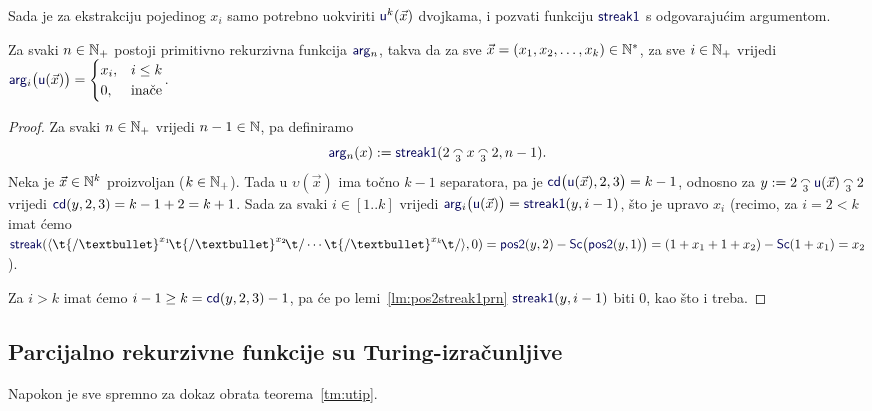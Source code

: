 Sada je za ekstrakciju pojedinog $x_i$ samo potrebno uokviriti $\f u^k(\vec x)$ dvojkama, i pozvati funkciju $\f{streak1}$ s odgovarajućim argumentom.

\begin{propozicija}\label{pp:argnprn}
Za svaki $n\in{\mathbb N}_+$ postoji primitivno rekurzivna funkcija $\f{arg}_n$, takva da za sve $\vec x=(x_1,x_2,\dotsc,x_k)\in{\mathbb N}^*$, za sve $i\in{\mathbb N}_+$ vrijedi $\f{arg}_i\bigl(\f u(\vec x)\bigr)=\begin{cases}
x_i,&i\le k\\
0,&\text{inače}
\end{cases}$.
\end{propozicija}

\begin{proof}
Za svaki $n\in{\mathbb N}_+$ vrijedi $n-1\in{\mathbb N}$, pa definiramo
\begin{equation}
    \f{arg}_n(x):=\f{streak1}(2\conc3x\conc32,n-1)\text.
\end{equation}
Neka je $\vec x\in{\mathbb N}^k$ proizvoljan ($k\in{\mathbb N}_+$). Tada u $\upsilon(\vec x)$ ima točno $k-1$ separatora, pa je $\f{cd}\bigl(\f u(\vec x),2,3\bigr)=k-1$, odnosno za $y:=2\conc3\f u(\vec x)\conc32$ vrijedi $\f{cd}(y,2,3)=k-1+2=k+1$. Sada za svaki $i\in[1..k]$ vrijedi $\f{arg}_i\bigl(\f u(\vec x)\bigr)=\f{streak1}(y,i-1)$, što je upravo $x_i$ (recimo, za $i=2<k$ imat ćemo $\f{streak}(\kr{\t{/\textbullet}^{x_1}\!\t{/\textbullet}^{x_2}\!\t/\dotsm\t{/\textbullet}^{x_k}\!\t/},0)=\f{pos2}(y,2)-\f{Sc}\bigl(\f{pos2}(y,1)\bigr)=(1+x_1+1+x_2)-\f{Sc}(1+x_1)=x_2$).

Za $i>k$ imat ćemo $i-1\ge k=\f{cd}(y,2,3)-1$, pa će po lemi~\ref{lm:pos2streak1prn} $\f{streak1}(y,i-1)$ biti $0$, kao što i treba.
\end{proof}

\subsection{Parcijalno rekurzivne funkcije su Turing-izračunljive}

Napokon je sve spremno za dokaz obrata teorema~\ref{tm:utip}.

